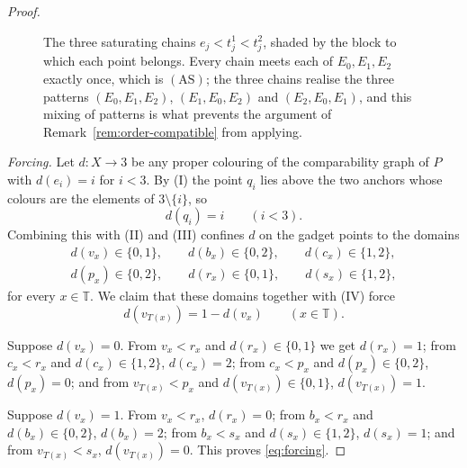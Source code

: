 \documentclass[11pt,reqno]{amsart}
\theoremstyle{plain}
\theoremstyle{definition}
\theoremstyle{remark}
\newcommand{\T}{\mathbb T}
\begin{document}
\begin{proof}
\begin{figure}[ht]
\caption{The three saturating chains $e_j<t_j^{1}<t_j^{2}$, shaded by the
block to which each point belongs. Every chain meets each of $E_0,E_1,E_2$
exactly once, which is $\mathrm{(AS)}$; the three chains realise the three
patterns $(E_0,E_1,E_2)$, $(E_1,E_0,E_2)$ and $(E_2,E_0,E_1)$, and this mixing
of patterns is what prevents the argument of
Remark~\ref{rem:order-compatible} from applying.}
\label{fig:saturation}
\end{figure}

\emph{Forcing.} Let $d:X\to3$ be any proper colouring of the comparability
graph of $P$ with $d(e_i)=i$ for $i<3$. By (I) the point $q_i$ lies above the
two anchors whose colours are the elements of $3\setminus\{i\}$, so
\[
d(q_i)=i\qquad(i<3).
\]
Combining this with (II) and (III) confines $d$ on the gadget points to the
domains
\begin{gather*}
d(v_x)\in\{0,1\},\qquad d(b_x)\in\{0,2\},\qquad d(c_x)\in\{1,2\},\\
d(p_x)\in\{0,2\},\qquad d(r_x)\in\{0,1\},\qquad d(s_x)\in\{1,2\},
\end{gather*}
for every $x\in\T$. We claim that these domains together with (IV) force
\begin{equation}
d(v_{T(x)})=1-d(v_x)\qquad(x\in\T).
\label{eq:forcing}
\end{equation}

Suppose $d(v_x)=0$. From $v_x<r_x$ and $d(r_x)\in\{0,1\}$ we get $d(r_x)=1$;
from $c_x<r_x$ and $d(c_x)\in\{1,2\}$, $d(c_x)=2$; from $c_x<p_x$ and
$d(p_x)\in\{0,2\}$, $d(p_x)=0$; and from $v_{T(x)}<p_x$ and
$d(v_{T(x)})\in\{0,1\}$, $d(v_{T(x)})=1$.

Suppose $d(v_x)=1$. From $v_x<r_x$, $d(r_x)=0$; from $b_x<r_x$ and
$d(b_x)\in\{0,2\}$, $d(b_x)=2$; from $b_x<s_x$ and $d(s_x)\in\{1,2\}$,
$d(s_x)=1$; and from $v_{T(x)}<s_x$, $d(v_{T(x)})=0$. This proves
\eqref{eq:forcing}.


\end{proof}
\end{document}
